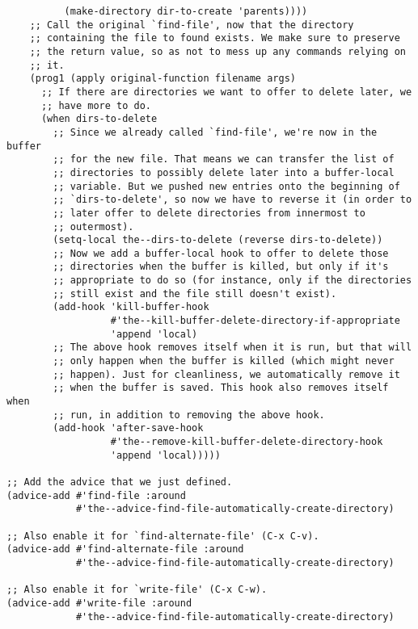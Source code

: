 \documentclass[11pt]{article}
\begin{document}
\begin{enumerate}
\begin{verbatim}
          (make-directory dir-to-create 'parents))))
    ;; Call the original `find-file', now that the directory
    ;; containing the file to found exists. We make sure to preserve
    ;; the return value, so as not to mess up any commands relying on
    ;; it.
    (prog1 (apply original-function filename args)
      ;; If there are directories we want to offer to delete later, we
      ;; have more to do.
      (when dirs-to-delete
        ;; Since we already called `find-file', we're now in the buffer
        ;; for the new file. That means we can transfer the list of
        ;; directories to possibly delete later into a buffer-local
        ;; variable. But we pushed new entries onto the beginning of
        ;; `dirs-to-delete', so now we have to reverse it (in order to
        ;; later offer to delete directories from innermost to
        ;; outermost).
        (setq-local the--dirs-to-delete (reverse dirs-to-delete))
        ;; Now we add a buffer-local hook to offer to delete those
        ;; directories when the buffer is killed, but only if it's
        ;; appropriate to do so (for instance, only if the directories
        ;; still exist and the file still doesn't exist).
        (add-hook 'kill-buffer-hook
                  #'the--kill-buffer-delete-directory-if-appropriate
                  'append 'local)
        ;; The above hook removes itself when it is run, but that will
        ;; only happen when the buffer is killed (which might never
        ;; happen). Just for cleanliness, we automatically remove it
        ;; when the buffer is saved. This hook also removes itself when
        ;; run, in addition to removing the above hook.
        (add-hook 'after-save-hook
                  #'the--remove-kill-buffer-delete-directory-hook
                  'append 'local)))))

;; Add the advice that we just defined.
(advice-add #'find-file :around
            #'the--advice-find-file-automatically-create-directory)

;; Also enable it for `find-alternate-file' (C-x C-v).
(advice-add #'find-alternate-file :around
            #'the--advice-find-file-automatically-create-directory)

;; Also enable it for `write-file' (C-x C-w).
(advice-add #'write-file :around
            #'the--advice-find-file-automatically-create-directory)


\end{verbatim}
\end{enumerate}
\end{document}
